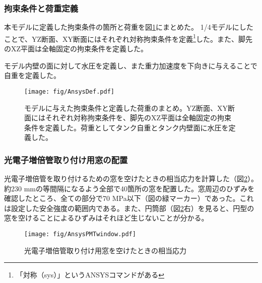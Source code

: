 \documentclass[11pt]{ltjsreport}
\newcommand{\figref}[1]{図\ref{#1}}
\begin{document}
\subsubsection{拘束条件と荷重定義}


本モデルに定義した拘束条件の箇所と荷重を\figref{AnsysDef}にまとめた。
1/4モデルにしたことで、YZ断面、XY断面にはそれぞれ対称拘束条件を定義\footnote{「対称（sys）」というANSYSコマンドがある}した。また、脚先のXZ平面は全軸固定の拘束条件を定義した。

モデル内壁の面に対して水圧を定義し、また重力加速度を下向きに与えることで自重を定義した。

\begin{figure}[h]
\centering
\texttt{[image: fig/AnsysDef.pdf]}
\caption[拘束条件と荷重定義]{モデルに与えた拘束条件と定義した荷重のまとめ。YZ断面、XY断面にはそれぞれ対称拘束条件を、脚先のXZ平面は全軸固定の拘束条件を定義した。荷重としてタンク自重とタンク内壁面に水圧を定義した。}
\label{AnsysDef}
\end{figure}




\subsubsection{光電子増倍管取り付け用窓の配置}
光電子増倍管を取り付けるための窓を空けたときの相当応力を計算した（\figref{AnsysPMTwindow}）。約230 mmの等間隔になるよう全部で40箇所の窓を配置した。窓周辺のひずみを確認したところ、全ての部分で70 MPa以下（図の緑マーカー）であった。これは設定した安全強度の範囲内である。また、円筒部（\figref{AnsysPMTwindow}右）を見ると、円型の窓を空けることによるひずみはそれほど生じないことが分かる。

\begin{figure}[htbp]
\centering
\texttt{[image: fig/AnsysPMTwindow.pdf]}
\caption[光電子増倍管取り付け用窓を空けたときの相当応力]{光電子増倍管取り付け用窓を空けたときの相当応力}
\label{AnsysPMTwindow}
\end{figure}
\end{document}
